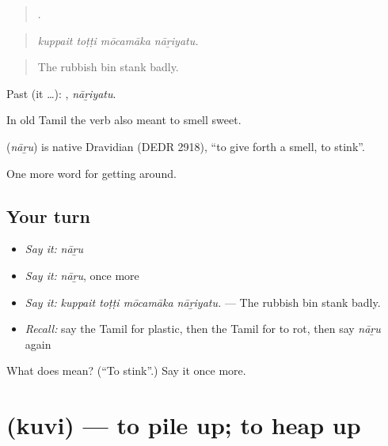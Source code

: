 \begin{quote}
   .
\end{quote}

\begin{quote}
\emph{kuppait toṭṭi mōcamāka nāṟiyatu.}
\end{quote}

\begin{quote}
The rubbish bin stank badly.
\end{quote}

Past (it …): , \emph{nāṟiyatu}.

In old Tamil the verb also meant to smell sweet.

\begin{cousinweb}
\textbf{} (\emph{nāṟu}) is native Dravidian (DEDR 2918), \textquotedblleft{}to give forth a smell, to stink\textquotedblright{}.
\end{cousinweb}

\begin{grammarlens}[title={What you've built}]
One more word for getting around.
\end{grammarlens}

\subsection*{Your turn}
\begin{itemize}
\raggedright
  \item \emph{Say it:} \emph{nāṟu}
  \item \emph{Say it:} \emph{nāṟu}, once more
  \item \emph{Say it:} \emph{kuppait toṭṭi mōcamāka nāṟiyatu.} — The rubbish bin stank badly.
  \item \emph{Recall:} say the Tamil for plastic, then the Tamil for to rot, then say \emph{nāṟu} again
\end{itemize}

\begin{tcolorbox}[breakable,colback=teal!4,colframe=teal!35!black,title={Before you move on}]
What does  mean? (\textquotedblleft{}To stink\textquotedblright{}.) Say it once more.
\end{tcolorbox}
\section[\texorpdfstring{\ta{குவி} (kuvi)}{குவி (kuvi)}]{ (kuvi) — to pile up; to heap up}

